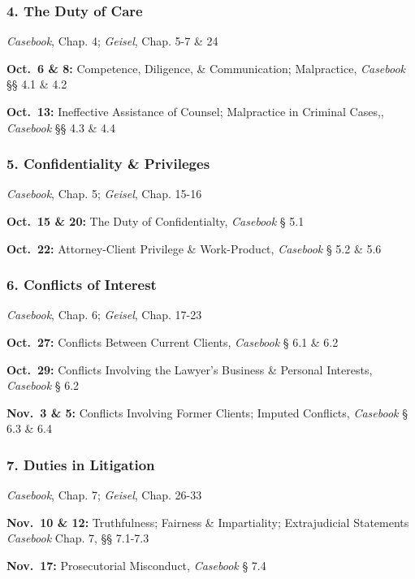 \documentclass[11pt,letterpaper,twoside]{article}
\begin{document}
\subsubsection{4. The Duty of Care}\label{the-duty-of-care}

\emph{Casebook}, Chap. 4; \emph{Geisel}, Chap. 5-7 \& 24

\textbf{Oct.~6 \& 8:} Competence, Diligence, \& Communication;
Malpractice, \emph{Casebook} §§ 4.1 \& 4.2

\textbf{Oct.~13:} Ineffective Assistance of Counsel; Malpractice in
Criminal Cases,, \emph{Casebook} §§ 4.3 \& 4.4

\subsubsection{5. Confidentiality \&
Privileges}\label{confidentiality-privileges}

\emph{Casebook}, Chap. 5; \emph{Geisel}, Chap. 15-16

\textbf{Oct.~15 \& 20:} The Duty of Confidentialty, \emph{Casebook} §
5.1

\textbf{Oct.~22:} Attorney-Client Privilege \& Work-Product,
\emph{Casebook} § 5.2 \& 5.6

\subsubsection{6. Conflicts of Interest}\label{conflicts-of-interest}

\emph{Casebook}, Chap. 6; \emph{Geisel}, Chap. 17-23

\textbf{Oct.~27:} Conflicts Between Current Clients, \emph{Casebook} §
6.1 \& 6.2

\textbf{Oct.~29:} Conflicts Involving the Lawyer's Business \& Personal
Interests, \emph{Casebook} § 6.2

\textbf{Nov.~3 \& 5:} Conflicts Involving Former Clients; Imputed
Conflicts, \emph{Casebook} § 6.3 \& 6.4

\subsubsection{7. Duties in Litigation}\label{duties-in-litigation}

\emph{Casebook}, Chap. 7; \emph{Geisel}, Chap. 26-33

\textbf{Nov.~10 \& 12:} Truthfulness; Fairness \& Impartiality;
Extrajudicial Statements \emph{Casebook} Chap. 7, §§ 7.1-7.3

\textbf{Nov.~17:} Prosecutorial Misconduct, \emph{Casebook} § 7.4
\end{document}
